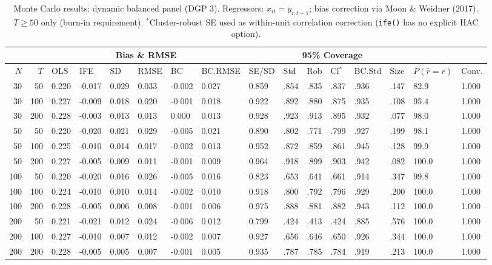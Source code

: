 \begin{table}[ht]
\centering
\caption{Monte Carlo results: dynamic balanced panel (DGP 3). Regressors: $x_{it} = y_{i,t-1}$; bias correction via Moon \& Weidner (2017). $T \geq 50$ only (burn-in requirement). $^*$Cluster-robust SE used as within-unit correlation correction (\texttt{ife()} has no explicit HAC option).} 
\label{tab:mc_dyn_bal}
\begin{tabular}{rrllllllllllllll}
  \hline
 & & \multicolumn{6}{c}{Bias \& RMSE} & & \multicolumn{4}{c}{95\% Coverage} & & & \\
\cline{3-8}\cline{10-13}
 \hline
$N$ & $T$ & OLS & IFE & SD & RMSE & BC & BC.RMSE & SE/SD & Std & Rob & Cl$^*$ & BC.Std & Size & $P(\hat r=r)$ & Conv. \\ 
  \hline
30 & 50 & 0.220 & -0.017 & 0.029 & 0.033 & -0.002 & 0.027 & 0.859 & .854 & .835 & .837 & .936 & .147 & 82.9 & 1.000 \\ 
  30 & 100 & 0.227 & -0.009 & 0.018 & 0.020 & -0.001 & 0.018 & 0.922 & .892 & .880 & .875 & .935 & .108 & 95.4 & 1.000 \\ 
  30 & 200 & 0.228 & -0.003 & 0.013 & 0.013 & 0.000 & 0.013 & 0.928 & .923 & .913 & .895 & .932 & .077 & 98.0 & 1.000 \\ 
  50 & 50 & 0.220 & -0.020 & 0.021 & 0.029 & -0.005 & 0.021 & 0.890 & .802 & .771 & .799 & .927 & .199 & 98.1 & 1.000 \\ 
  50 & 100 & 0.225 & -0.010 & 0.014 & 0.017 & -0.002 & 0.013 & 0.952 & .872 & .859 & .861 & .945 & .128 & 99.9 & 1.000 \\ 
  50 & 200 & 0.227 & -0.005 & 0.009 & 0.011 & -0.001 & 0.009 & 0.964 & .918 & .899 & .903 & .942 & .082 & 100.0 & 1.000 \\ 
  100 & 50 & 0.220 & -0.020 & 0.016 & 0.026 & -0.005 & 0.016 & 0.823 & .653 & .641 & .661 & .914 & .347 & 99.8 & 1.000 \\ 
  100 & 100 & 0.224 & -0.010 & 0.010 & 0.014 & -0.002 & 0.010 & 0.918 & .800 & .792 & .796 & .929 & .200 & 100.0 & 1.000 \\ 
  100 & 200 & 0.228 & -0.005 & 0.006 & 0.008 & -0.001 & 0.006 & 0.975 & .888 & .881 & .882 & .943 & .112 & 100.0 & 1.000 \\ 
  200 & 50 & 0.221 & -0.021 & 0.012 & 0.024 & -0.006 & 0.012 & 0.799 & .424 & .413 & .424 & .885 & .576 & 100.0 & 1.000 \\ 
  200 & 100 & 0.227 & -0.010 & 0.007 & 0.012 & -0.002 & 0.007 & 0.927 & .656 & .646 & .650 & .926 & .344 & 100.0 & 1.000 \\ 
  200 & 200 & 0.228 & -0.005 & 0.005 & 0.007 & -0.001 & 0.005 & 0.935 & .787 & .785 & .784 & .919 & .213 & 100.0 & 1.000 \\ 
   \hline
\end{tabular}
\end{table}
